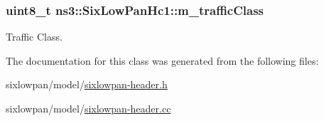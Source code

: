 \subsubsection[{\texorpdfstring{m\+\_\+traffic\+Class}{m_trafficClass}}]{\setlength{\rightskip}{0pt plus 5cm}uint8\+\_\+t ns3\+::\+Six\+Low\+Pan\+Hc1\+::m\+\_\+traffic\+Class\hspace{0.3cm}{\ttfamily [private]}}\hypertarget{classns3_1_1SixLowPanHc1_aec4705ba6a7ea59f42d6946622ed014a}{}\label{classns3_1_1SixLowPanHc1_aec4705ba6a7ea59f42d6946622ed014a}


Traffic Class. 



The documentation for this class was generated from the following files\+:\begin{DoxyCompactItemize}
\item 
sixlowpan/model/\hyperlink{sixlowpan-header_8h}{sixlowpan-\/header.\+h}\item 
sixlowpan/model/\hyperlink{sixlowpan-header_8cc}{sixlowpan-\/header.\+cc}\end{DoxyCompactItemize}
